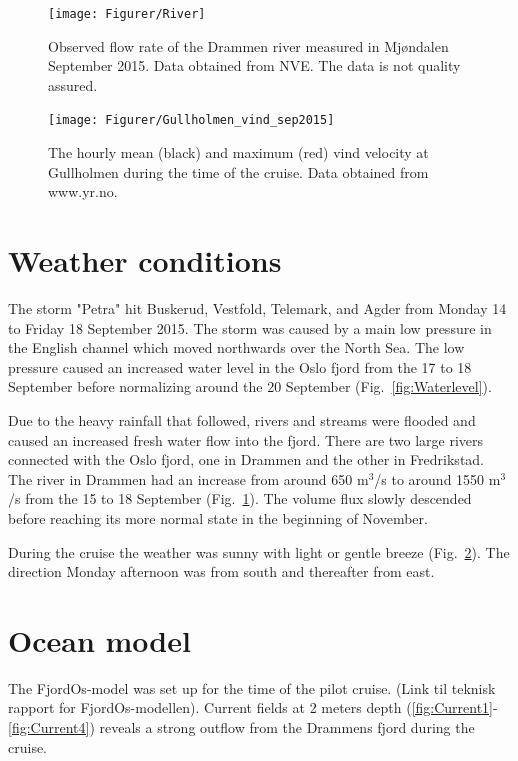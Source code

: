 \documentclass[12pt,a4paper,english]{article}
\begin{document}
\begin{figure}[tb]
\centerline{
\texttt{[image: Figurer/River]}}
\caption{\small
Observed flow rate of the Drammen river measured in Mj\o ndalen September 2015. Data obtained from NVE. The data is not quality assured.}
\label{fig:River}
\end{figure}

\begin{figure}[tb]
\centerline{
\texttt{[image: Figurer/Gullholmen\_vind\_sep2015]}}
\caption{\small
The hourly mean (black) and maximum (red) vind velocity at Gullholmen during the time of the cruise. Data obtained from www.yr.no.}
\label{fig:Wind}
\end{figure}

\section{Weather conditions}

The storm "Petra" hit Buskerud, Vestfold, Telemark, and Agder from Monday 14 to Friday 18 September 2015. The storm was caused by a main low pressure in the English channel which moved northwards over the North Sea. The low pressure caused an increased water level in the Oslo fjord from the 17 to 18 September before normalizing around the 20 September (Fig.~\ref{fig:Waterlevel}).

Due to the heavy rainfall that followed, rivers and streams were flooded and caused an increased fresh water flow into the fjord. There are two large rivers connected with the Oslo fjord, one in Drammen and the other in Fredrikstad. The river in Drammen had an increase from around 650 m$^3$/s to around 1550 m$^3$/s from the 15 to 18 September (Fig.~\ref{fig:River}). The volume flux slowly descended before reaching its more normal state in the beginning of November. 

During the cruise the weather was sunny with light or gentle breeze (Fig.~\ref{fig:Wind}). The direction Monday afternoon was from south  and thereafter from east. 

\section{Ocean model}
The FjordOs-model was set up for the time of the pilot cruise. (Link til teknisk rapport for FjordOs-modellen). Current fields at 2 meters depth (\ref{fig:Current1}-\ref{fig:Current4}) reveals a strong outflow from the Drammens fjord during the cruise. 
\end{document}
